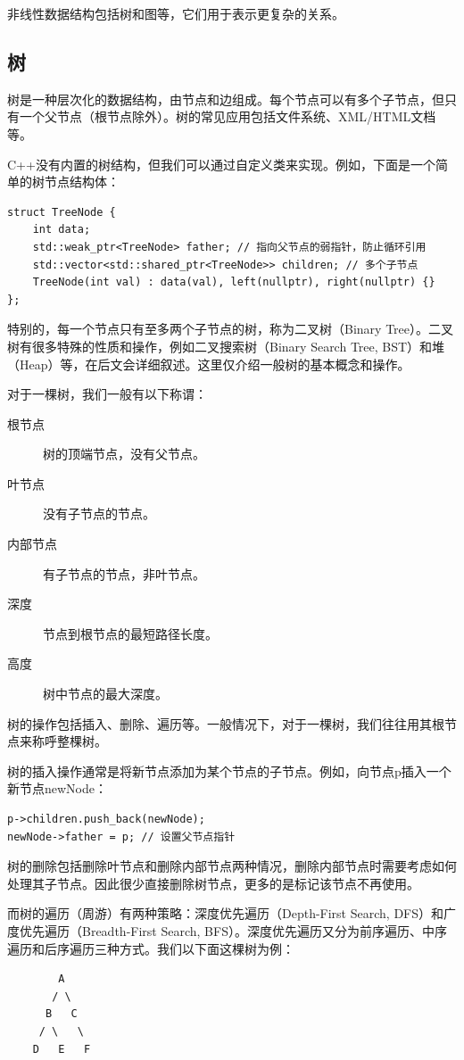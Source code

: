 非线性数据结构包括树和图等，它们用于表示更复杂的关系。

\subsection{树}

树是一种层次化的数据结构，由节点和边组成。每个节点可以有多个子节点，但只有一个父节点（根节点除外）。树的常见应用包括文件系统、XML/HTML文档等。

C++没有内置的树结构，但我们可以通过自定义类来实现。例如，下面是一个简单的树节点结构体：
\begin{verbatim}
struct TreeNode {
    int data;
    std::weak_ptr<TreeNode> father; // 指向父节点的弱指针，防止循环引用
    std::vector<std::shared_ptr<TreeNode>> children; // 多个子节点
    TreeNode(int val) : data(val), left(nullptr), right(nullptr) {}
};
\end{verbatim}

特别的，每一个节点只有至多两个子节点的树，称为二叉树（Binary Tree）。二叉树有很多特殊的性质和操作，例如二叉搜索树（Binary Search Tree, BST）和堆（Heap）等，在后文会详细叙述。这里仅介绍一般树的基本概念和操作。

对于一棵树，我们一般有以下称谓：
\begin{description}
    \item[根节点] 树的顶端节点，没有父节点。
    \item[叶节点] 没有子节点的节点。
    \item[内部节点] 有子节点的节点，非叶节点。
    \item[深度] 节点到根节点的最短路径长度。
    \item[高度] 树中节点的最大深度。 
\end{description}

树的操作包括插入、删除、遍历等。一般情况下，对于一棵树，我们往往用其根节点来称呼整棵树。

树的插入操作通常是将新节点添加为某个节点的子节点。例如，向节点p插入一个新节点newNode：
\begin{verbatim}
p->children.push_back(newNode);
newNode->father = p; // 设置父节点指针
\end{verbatim}

树的删除包括删除叶节点和删除内部节点两种情况，删除内部节点时需要考虑如何处理其子节点。因此很少直接删除树节点，更多的是标记该节点不再使用。

而树的遍历（周游）有两种策略：深度优先遍历（Depth-First Search, DFS）和广度优先遍历（Breadth-First Search, BFS）。深度优先遍历又分为前序遍历、中序遍历和后序遍历三种方式。我们以下面这棵树为例：
\begin{verbatim}
        A
       / \
      B   C
     / \   \
    D   E   F
\end{verbatim}

